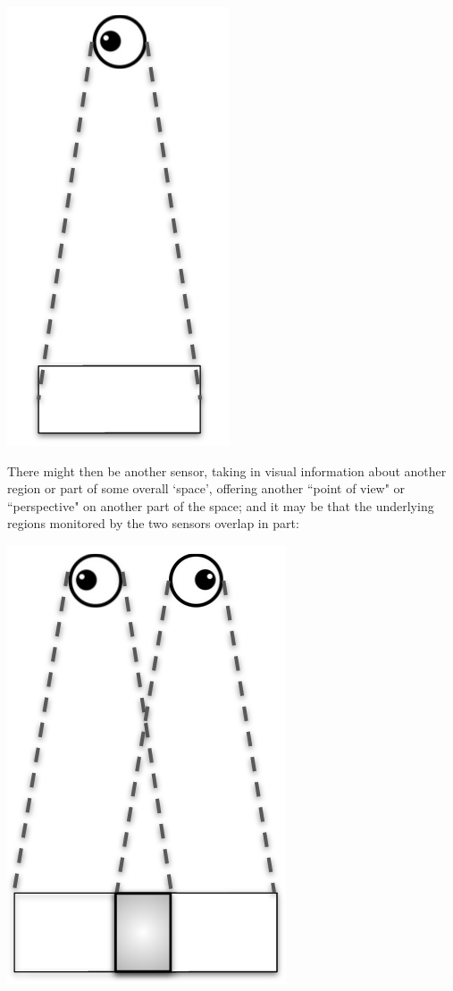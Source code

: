 \documentclass[11pt]{book}
\theoremstyle{definition}
\theoremstyle{definition}
\theoremstyle{definition}
\theoremstyle{theorem}
\theoremstyle{definition}
\begin{document}
	\begin{center}
		\includegraphics[scale=0.25]{Eyeball1.png}
	\end{center}
	There might then be another sensor, taking in visual information about another region or part of some overall `space', offering another ``point of view" or ``perspective" on another part of the space; and it may be that the underlying regions monitored by the two sensors overlap in part:
	\begin{center}
		\includegraphics[scale=0.25]{Eyeball2.png}
	\end{center}
\end{document}
